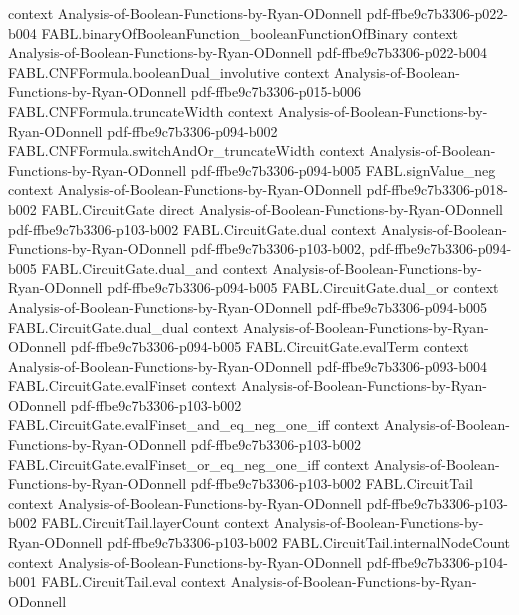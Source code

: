 \begin{theorem}
  {context}
  {Analysis-of-Boolean-Functions-by-Ryan-ODonnell}
  {pdf-ffbe9c7b3306-p022-b004}
\proofstep
  {FABL.binaryOfBooleanFunction_booleanFunctionOfBinary}
  {context}
  {Analysis-of-Boolean-Functions-by-Ryan-ODonnell}
  {pdf-ffbe9c7b3306-p022-b004}
\proofstep
  {FABL.CNFFormula.booleanDual_involutive}
  {context}
  {Analysis-of-Boolean-Functions-by-Ryan-ODonnell}
  {pdf-ffbe9c7b3306-p015-b006}
\proofstep
  {FABL.CNFFormula.truncateWidth}
  {context}
  {Analysis-of-Boolean-Functions-by-Ryan-ODonnell}
  {pdf-ffbe9c7b3306-p094-b002}
\proofstep
  {FABL.CNFFormula.switchAndOr_truncateWidth}
  {context}
  {Analysis-of-Boolean-Functions-by-Ryan-ODonnell}
  {pdf-ffbe9c7b3306-p094-b005}
\proofstep
  {FABL.signValue_neg}
  {context}
  {Analysis-of-Boolean-Functions-by-Ryan-ODonnell}
  {pdf-ffbe9c7b3306-p018-b002}
\proofstep
  {FABL.CircuitGate}
  {direct}
  {Analysis-of-Boolean-Functions-by-Ryan-ODonnell}
  {pdf-ffbe9c7b3306-p103-b002}
\proofstep
  {FABL.CircuitGate.dual}
  {context}
  {Analysis-of-Boolean-Functions-by-Ryan-ODonnell}
  {pdf-ffbe9c7b3306-p103-b002,
    pdf-ffbe9c7b3306-p094-b005}
\proofstep
  {FABL.CircuitGate.dual_and}
  {context}
  {Analysis-of-Boolean-Functions-by-Ryan-ODonnell}
  {pdf-ffbe9c7b3306-p094-b005}
\proofstep
  {FABL.CircuitGate.dual_or}
  {context}
  {Analysis-of-Boolean-Functions-by-Ryan-ODonnell}
  {pdf-ffbe9c7b3306-p094-b005}
\proofstep
  {FABL.CircuitGate.dual_dual}
  {context}
  {Analysis-of-Boolean-Functions-by-Ryan-ODonnell}
  {pdf-ffbe9c7b3306-p094-b005}
\proofstep
  {FABL.CircuitGate.evalTerm}
  {context}
  {Analysis-of-Boolean-Functions-by-Ryan-ODonnell}
  {pdf-ffbe9c7b3306-p093-b004}
\proofstep
  {FABL.CircuitGate.evalFinset}
  {context}
  {Analysis-of-Boolean-Functions-by-Ryan-ODonnell}
  {pdf-ffbe9c7b3306-p103-b002}
\proofstep
  {FABL.CircuitGate.evalFinset_and_eq_neg_one_iff}
  {context}
  {Analysis-of-Boolean-Functions-by-Ryan-ODonnell}
  {pdf-ffbe9c7b3306-p103-b002}
\proofstep
  {FABL.CircuitGate.evalFinset_or_eq_neg_one_iff}
  {context}
  {Analysis-of-Boolean-Functions-by-Ryan-ODonnell}
  {pdf-ffbe9c7b3306-p103-b002}
\proofstep
  {FABL.CircuitTail}
  {context}
  {Analysis-of-Boolean-Functions-by-Ryan-ODonnell}
  {pdf-ffbe9c7b3306-p103-b002}
\proofstep
  {FABL.CircuitTail.layerCount}
  {context}
  {Analysis-of-Boolean-Functions-by-Ryan-ODonnell}
  {pdf-ffbe9c7b3306-p103-b002}
\proofstep
  {FABL.CircuitTail.internalNodeCount}
  {context}
  {Analysis-of-Boolean-Functions-by-Ryan-ODonnell}
  {pdf-ffbe9c7b3306-p104-b001}
\proofstep
  {FABL.CircuitTail.eval}
  {context}
  {Analysis-of-Boolean-Functions-by-Ryan-ODonnell}

\end{theorem}
